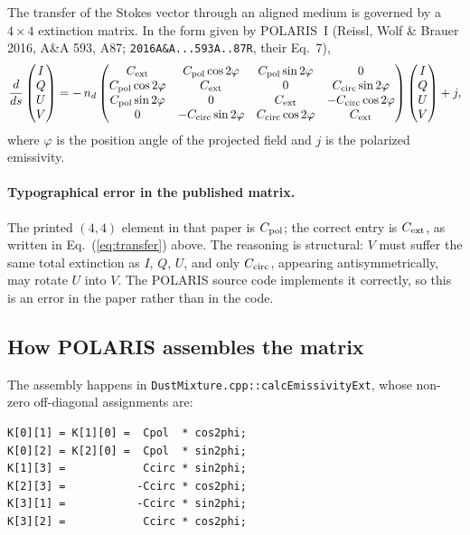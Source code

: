 \documentclass{my_memo}
\newcommand{\code}[1]{\texttt{#1}}
\newcommand{\Cext}{\ensuremath{C_{\rm ext}}}
\newcommand{\Cpol}{\ensuremath{C_{\rm pol}}}
\newcommand{\Ccirc}{\ensuremath{C_{\rm circ}}}
\begin{document}
The transfer of the Stokes vector through an aligned medium is governed
by a $4\times4$ extinction matrix. In the form given by POLARIS~I
(Reissl, Wolf \& Brauer 2016, A\&A 593, A87;
\code{2016A\&A...593A..87R}, their Eq.~7),
\begin{equation}
  \frac{d}{ds}
  \begin{pmatrix} I \\ Q \\ U \\ V \end{pmatrix}
  = -\,n_d
  \begin{pmatrix}
    \Cext & \Cpol\cos2\varphi & \Cpol\sin2\varphi & 0 \\
    \Cpol\cos2\varphi & \Cext & 0 & \Ccirc\sin2\varphi \\
    \Cpol\sin2\varphi & 0 & \Cext & -\Ccirc\cos2\varphi \\
    0 & -\Ccirc\sin2\varphi & \Ccirc\cos2\varphi & \Cext
  \end{pmatrix}
  \begin{pmatrix} I \\ Q \\ U \\ V \end{pmatrix}
  + j,
  \label{eq:transfer}
\end{equation}
where $\varphi$ is the position angle of the projected field and
$j$ is the polarized emissivity.

\paragraph{Typographical error in the published matrix.} The printed
$(4,4)$ element in that paper is $\Cpol$; the correct entry is $\Cext$,
as written in Eq.~(\ref{eq:transfer}) above. The reasoning is structural:
$V$ must suffer the same total extinction as $I$, $Q$, $U$, and only
$\Ccirc$, appearing antisymmetrically, may rotate $U$ into $V$. The
POLARIS source code implements it correctly, so this is an error in the
paper rather than in the code.

\subsection{How POLARIS assembles the matrix}

The assembly happens in \code{DustMixture.cpp::calcEmissivityExt}, whose
non-zero off-diagonal assignments are:

\begin{lstlisting}[style=cpp]
K[0][1] = K[1][0] =  Cpol  * cos2phi;
K[0][2] = K[2][0] =  Cpol  * sin2phi;
K[1][3] =            Ccirc * sin2phi;
K[2][3] =           -Ccirc * cos2phi;
K[3][1] =           -Ccirc * sin2phi;
K[3][2] =            Ccirc * cos2phi;
\end{lstlisting}
\end{document}
